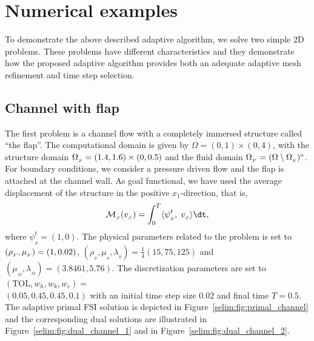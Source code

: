 \section{Numerical examples}

To demonstrate the above described adaptive algorithm, we solve two
simple 2D problems. These problems have different characteristics and
they demonstrate how the proposed adaptive algorithm provides both an
adequate adaptive mesh refinement and time step selection.

\subsection{Channel with flap}

The first problem is a channel flow with a completely immersed
structure called ``the flap''. The computational domain is given by
$\Omega = (0, 1)\times (0,4)$, with the structure domain $\Omega_{_{S}} = (1.4,
1.6)\times (0, 0.5)$ and the fluid domain $\Omega_{_{F}} = (\Omega\setminus
\Omega_{_{S}})^{\circ}$. For boundary conditions, we consider a pressure driven
flow and the flap is attached at the channel wall. As goal functional,
we have used the average displacement of the structure in the positive
$x_1$-direction, that is,
\begin{equation}
\label{selim:eq:goalfunctional_channel}
\M_{_{S}}(v_{_{S}}) = \int_0^T \langle \psi^t_{_{S}},\;
v_{_{S}}\rangle \dt,
\end{equation}
where $\psi^t_{_{S}} = (1,0)$. The physical parameters related to the
problem is set to $(\rho_{_{F}},\mu_{_{F}}) = (1, 0.02)$,
$(\rho_{_{S}},\mu_{_{S}}, \lambda_{_{S}}) = \tfrac{1}{4}(15, 75, 125)$
and $(\mu_{_{M}}, \lambda_{_{M}}) = (3.8461, 5.76)$. The
discretization parameters are set to $(\mathrm{TOL}, w_h, w_k,w_c) =$\\
$(0.05, 0.45, 0.45, 0.1)$ with an initial time step size $0.02$ and
final time $T=0.5$. The
adaptive primal FSI solution is depicted in
Figure~\ref{selim:fig:primal_channel} and the corresponding dual
solutions are illustrated in Figure~\ref{selim:fig:dual_channel_1}
and in Figure~\ref{selim:fig:dual_channel_2}.

